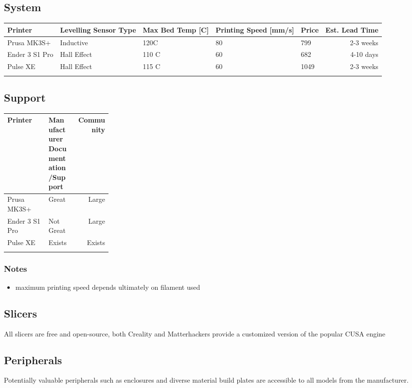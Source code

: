 \documentclass[11pt]{article}
\begin{document}
\subsection{System}
\label{sec:orgf714514}

\begin{center}
\begin{tabular}{lllllr}
Printer & Levelling Sensor Type & Max Bed Temp [C] & Printing Speed [mm/s] & Price & Est. Lead Time\\
\hline
Prusa MK3S+ & Inductive & 120C & 80 & 799 & 2-3 weeks \\
Ender 3 S1 Pro & Hall Effect & 110 C & 60 & 682 & 4-10 days\\
Pulse XE & Hall Effect & 115 C & 60 & 1049 & 2-3 weeks\\
 &  &  &  &  & \\
\end{tabular}
\end{center}

\subsection{Support}
\label{sec:orgf714515}

\begin{center}
\begin{tabular}{lp{0.25\linewidth}r}
Printer & Manufacturer Documentation/Support & Community\\
\hline
Prusa MK3S+ & Great & Large\\
Ender 3 S1 Pro & Not Great & Large\\
Pulse XE & Exists & Exists\\
 &  & \\
\end{tabular}
\end{center}

\subsubsection{Notes}
\label{sec:org27c6796}
\begin{itemize}
\item maximum printing speed depends ultimately on filament used
\end{itemize}

\subsection{Slicers}
\label{sec:org5478cf1}
All slicers are free and open-source, both Creality and Matterhackers provide a customized version of the popular CUSA engine

\subsection{Peripherals}
\label{sec:orgeda61f0}
Potentially valuable peripherals such as enclosures and diverse material build plates are accessible to all models from the manufacturer.
\end{document}
